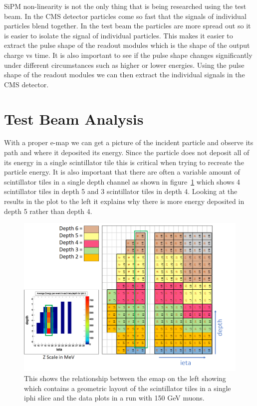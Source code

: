 SiPM non-linearity is not the only thing that is being researched using the test beam. In the CMS detector particles come so fast that the signals of individual particles blend together. In the test beam the particles are more spread out so it is easier to isolate the signal of individual particles. This makes it easier to extract the pulse shape of the readout modules which is the shape of the output charge vs time. It is also important to see if the pulse shape changes significantly under different circumstances such as higher or lower energies. Using the pulse shape of the readout modules we can then extract the individual signals in the CMS detector.

\section{Test Beam Analysis}

With a proper e-map we can get a picture of the incident particle and observe its path and where it deposited its energy. Since the particle does not deposit all of its energy in a single scintillator tile this is critical when trying to recreate the particle energy. It is also important that there are often a variable amount of scintillator tiles in a single depth channel as shown in figure~\ref{fig:emap} which shows 4 scintillator tiles in depth 5 and 3 scintillator tiles in depth 4. Looking at the results in the plot to the left it explains why there is more energy deposited in depth 5 rather than depth 4. 

\begin{figure}
\centering
\includegraphics[width=\linewidth]{Figures/eplot.png}
\caption{This shows the relationship between the emap on the left showing which contains a geometric layout of the scintillator tiles in a single iphi slice and the data plots in a run with 150 GeV muons.}
\label{fig:emap}
\end{figure}

